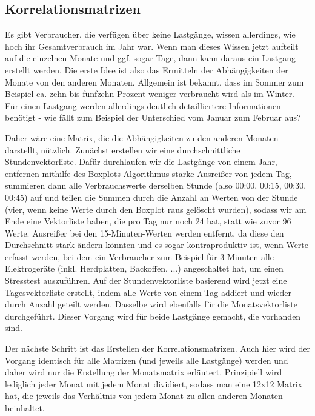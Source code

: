 
\subsection{Korrelationsmatrizen}

Es gibt Verbraucher, die verfügen über keine Lastgänge, wissen allerdings, wie hoch ihr Gesamtverbrauch im Jahr war. Wenn man dieses Wissen jetzt aufteilt auf die einzelnen Monate und ggf. sogar Tage, dann kann daraus ein Lastgang erstellt werden. Die erste Idee ist also das Ermitteln der Abhängigkeiten der Monate von den anderen Monaten. Allgemein ist bekannt, dass im Sommer zum Beispiel ca. zehn bis fünfzehn Prozent weniger verbraucht wird als im Winter. Für einen Lastgang werden allerdings deutlich detailliertere Informationen benötigt - wie fällt zum Beispiel der Unterschied vom Januar zum Februar aus? 

Daher wäre eine Matrix, die die Abhängigkeiten zu den anderen Monaten darstellt, nützlich. Zunächst erstellen wir eine durchschnittliche Stundenvektorliste. Dafür durchlaufen wir die Lastgänge von einem Jahr, entfernen mithilfe des Boxplots Algorithmus starke Ausreißer von jedem Tag, summieren dann alle Verbrauchswerte derselben Stunde (also 00:00, 00:15, 00:30, 00:45) auf und teilen die Summen durch die Anzahl an Werten von der Stunde (vier, wenn keine Werte durch den Boxplot raus gelöscht wurden), sodass wir am Ende eine Vektorliste haben, die pro Tag nur noch 24 hat, statt wie zuvor 96 Werte. Ausreißer bei den 15-Minuten-Werten werden entfernt, da diese den Durchschnitt stark ändern könnten und es sogar kontraproduktiv ist, wenn Werte erfasst werden, bei dem ein Verbraucher zum Beispiel für 3 Minuten alle Elektrogeräte (inkl. Herdplatten, Backoffen, ...) angeschaltet hat, um einen Stresstest auszuführen. Auf der Stundenvektorliste basierend wird jetzt eine Tagesvektorliste erstellt, indem alle Werte von einem Tag addiert und wieder durch Anzahl geteilt werden. Dasselbe wird ebenfalls für die Monatsvektorliste durchgeführt. Dieser Vorgang wird für beide Lastgänge gemacht, die vorhanden sind. 

Der nächste Schritt ist das Erstellen der Korrelationsmatrizen. Auch hier wird der Vorgang identisch für alle Matrizen (und jeweils alle Lastgänge) werden und daher wird nur die Erstellung der Monatsmatrix erläutert. Prinzipiell wird lediglich jeder Monat mit jedem Monat dividiert, sodass man eine 12x12 Matrix hat, die jeweils das Verhältnis von jedem Monat zu allen anderen Monaten beinhaltet. %

